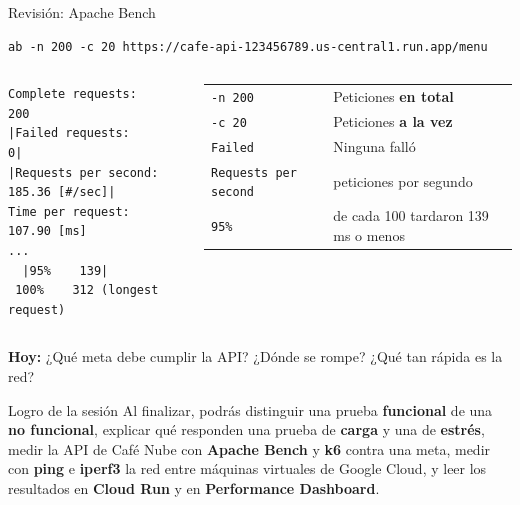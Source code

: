 \documentclass[aspectratio=169,10pt,c]{beamer}
\begin{document}
\begin{frame}[fragile]{Revisión: Apache Bench}
\begin{lstlisting}[style=terminal,basicstyle=\ttfamily\small\color{white}]
ab -n 200 -c 20 https://cafe-api-123456789.us-central1.run.app/menu
\end{lstlisting}
\vspace{1mm}
\begin{columns}[T,onlytextwidth]
\begin{lstlisting}[style=terminal]
Complete requests:      200
|Failed requests:        0|
|Requests per second:    185.36 [#/sec]|
Time per request:       107.90 [ms]
...
  |95%    139|
 100%    312 (longest request)
\end{lstlisting}
\renewcommand{\arraystretch}{1.2}
\small
\begin{tabular}{@{}>{\raggedright\arraybackslash}p{3.3cm}>{\raggedright\arraybackslash}p{3.3cm}@{}}
\toprule
\texttt{-n 200} & Peticiones \textbf{en total}\\
\texttt{-c 20} & Peticiones \textbf{a la vez}\\
\texttt{Failed} & Ninguna falló\\
\texttt{Requests per second} & 185 peticiones por segundo\\
\texttt{95\%} & 95 de cada 100 tardaron 139 ms o menos\\
\bottomrule
\end{tabular}
\end{columns}
\vspace{3mm}
{\small \textbf{Hoy:} ¿Qué meta debe cumplir la API? ¿Dónde se rompe? ¿Qué tan rápida es la red?}
\end{frame}

\begin{frame}[c]
\begin{block}{Logro de la sesión}
Al finalizar, podrás distinguir una prueba \textbf{funcional} de una \textbf{no funcional}, explicar qué responden una prueba de \textbf{carga} y una de \textbf{estrés}, medir la API de Café Nube con \textbf{Apache Bench} y \textbf{k6} contra una meta, medir con \textbf{ping} e \textbf{iperf3} la red entre máquinas virtuales de Google Cloud, y leer los resultados en \textbf{Cloud Run} y en \textbf{Performance Dashboard}.
\end{block}
\end{frame}
\end{document}
